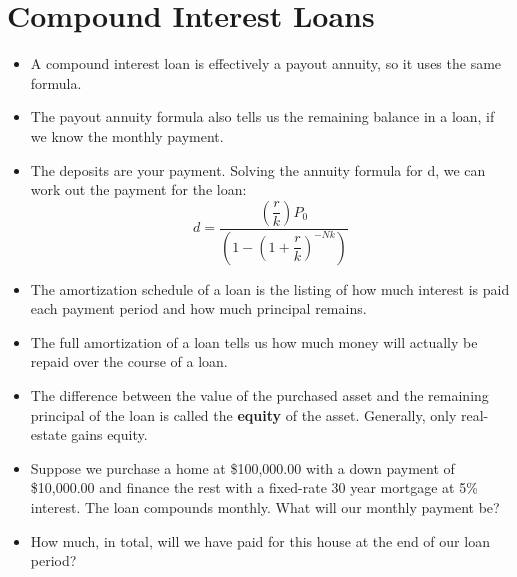 \documentclass{article}
\begin{document}
\section{Compound Interest Loans}
\begin{itemize}
    \item A compound interest loan is effectively a payout annuity, so
        it uses the same formula.
    \item The payout annuity formula also tells us the remaining
        balance in a loan, if we know the monthly payment.
    \item The deposits are your payment.  Solving the annuity formula
        for d, we can work out the payment for the loan:
        \[
        d = \dfrac{\left(\dfrac{r}{k}\right) P_0}%
                  {\left(1-\left(1+\dfrac{r}{k}\right)^{-Nk} \right)}
        \]
    \item The amortization schedule of a loan is the listing of how
        much interest is paid each payment period and how much
        principal remains.
    \item The full amortization of a loan tells us how much money
        will actually be repaid over the course of a loan.
    \item The difference between the value of the purchased asset
        and the remaining principal of the loan is called the
        \textbf{equity} of the asset.  Generally, only real-estate gains
        equity.
    \item Suppose we purchase a home at \$100,000.00 with a down
        payment of \$10,000.00 and finance the rest with a fixed-rate
        30 year mortgage at 5\% interest.  The loan compounds monthly.
        What will our monthly payment be?
    \item How much, in total, will we have paid for this house at the
        end of our loan period?
\end{itemize}
\end{document}
